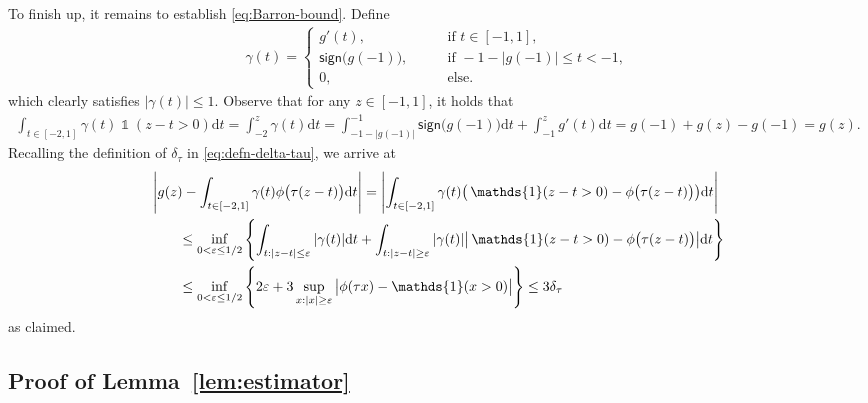 \documentclass[english]{article}
\DeclareMathOperator{\ind}{\mathds{1}}  %
\begin{document}
To finish up, it remains to establish \eqref{eq:Barron-bound}. 
%
Define 
%
\begin{align}
    \gamma(t) = 
    \begin{cases}
        g'(t), & \text{if }t\in [-1,1], \\
        \mathsf{sign}\big(g(-1)\big),\qquad & \text{if }-1-|g(-1)|\le t < -1, \\
        0, & \text{else}. 
    \end{cases}
\end{align}
%
which clearly satisfies $|\gamma(t)| \le 1$.
Observe that for any $z\in[-1,1]$, it holds that
%
\begin{align*}
\int_{t\in[-2, 1]} \gamma(t)\ind(z-t>0)\mathrm{d} t = \int_{-2}^{z} \gamma(t)\mathrm{d} t = \int_{-1-|g(-1)|}^{-1}\mathsf{sign}\big(g(-1)\big)\mathrm{d} t + \int_{-1}^z g'(t)\mathrm{d} t = g(-1) + g(z) - g(-1) = g(z).
\end{align*}
%
Recalling the definition of $\delta_\tau$ in \eqref{eq:defn-delta-tau}, we arrive at
%
\begin{align*}
&\left|g(z) -  \int_{t\in[-2, 1]} \gamma(t)\phi\big(\tau(z-t)\big)\mathrm{d} t\right|
= \left|\int_{t\in[-2, 1]} \gamma(t)\big(\ind(z-t>0)-\phi\big(\tau(z-t)\big)\big)\mathrm{d} t\right|\notag\\
&\qquad \le\inf_{0<\varepsilon\le 1/2}\left\{ \int_{t:|z-t|\le \varepsilon}|\gamma(t)|\mathrm{d}t + \int_{t:|z-t|\ge \varepsilon} |\gamma(t)|\big|\ind(z-t>0)-\phi\big(\tau(z-t)\big)\big|\mathrm{d} t\right\}\notag\\
&\qquad \le \inf_{0<\varepsilon\le 1/2}\left\{2\varepsilon + 3\sup_{x:|x|\ge \varepsilon} \big|\phi(\tau x) - \ind(x>0) \big|\right\}\le 3\delta_\tau
\end{align*}
%
as claimed. 

\subsection{Proof of Lemma~\ref{lem:estimator}}
\label{subsec:proof-lem-estimator}
\end{document}
